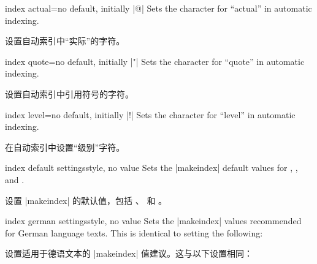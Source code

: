

\begin{docTcbKey}{index actual}{=}{no default, initially |@|}
Sets the character for \enquote{actual} in automatic indexing.

设置自动索引中“实际”的字符。
\end{docTcbKey}

\begin{docTcbKey}{index quote}{=}{no default, initially |"|}
Sets the character for \enquote{quote} in automatic indexing.

设置自动索引中引用符号的字符。
\end{docTcbKey}

\begin{docTcbKey}{index level}{=}{no default, initially |!|}
Sets the character for \enquote{level} in automatic indexing.

在自动索引中设置“级别”字符。
\end{docTcbKey}

\begin{docTcbKey}{index default settings}{}{style, no value}
Sets the |makeindex| default values for
,
, and
.

设置 |makeindex| 的默认值，包括 、 和 。
\end{docTcbKey}


\begin{docTcbKey}{index german settings}{}{style, no value}
Sets the |makeindex| values recommended for German language texts.
This is identical to setting the following:

设置适用于德语文本的 |makeindex| 值建议。这与以下设置相同：
\begin{dispListing}
\end{dispListing}
\end{docTcbKey}

